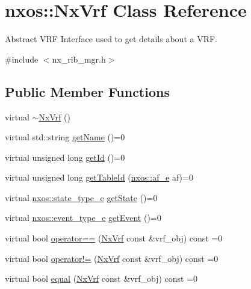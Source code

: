 \hypertarget{classnxos_1_1_nx_vrf}{}\section{nxos\+:\+:Nx\+Vrf Class Reference}
\label{classnxos_1_1_nx_vrf}


Abstract V\+RF Interface used to get details about a V\+RF.  




{\ttfamily \#include $<$nx\+\_\+rib\+\_\+mgr.\+h$>$}

\subsection*{Public Member Functions}
\begin{DoxyCompactItemize}
\item 
virtual \mbox{\hyperlink{classnxos_1_1_nx_vrf_ad5f50e3424b3d78304447600a3678e0b}{$\sim$\+Nx\+Vrf}} ()
\item 
virtual std\+::string \mbox{\hyperlink{classnxos_1_1_nx_vrf_a276a8d8170f372089a5653bdd7febfde}{get\+Name}} ()=0
\item 
virtual unsigned long \mbox{\hyperlink{classnxos_1_1_nx_vrf_a4ab30d5ff7a1d5d2abbab21652cd59fa}{get\+Id}} ()=0
\item 
virtual unsigned long \mbox{\hyperlink{classnxos_1_1_nx_vrf_a6f1529908decf0dfb531e674440d82ed}{get\+Table\+Id}} (\mbox{\hyperlink{nx__common_8h_a3a667f48b94db10aa398940dc5bf72d7}{nxos\+::af\+\_\+e}} af)=0
\item 
virtual \mbox{\hyperlink{nx__common_8h_a7c257059d03188765435b36e95dbb764}{nxos\+::state\+\_\+type\+\_\+e}} \mbox{\hyperlink{classnxos_1_1_nx_vrf_a443e508684e9804f14cc3526302ac8b4}{get\+State}} ()=0
\item 
virtual \mbox{\hyperlink{nx__common_8h_af9a9040b7681199d386e94eb888018cb}{nxos\+::event\+\_\+type\+\_\+e}} \mbox{\hyperlink{classnxos_1_1_nx_vrf_a42bdba27e42981d74066a72c24809c98}{get\+Event}} ()=0
\item 
virtual bool \mbox{\hyperlink{classnxos_1_1_nx_vrf_adc5d2e97b5fceb4fab75c448fb54ada5}{operator==}} (\mbox{\hyperlink{classnxos_1_1_nx_vrf}{Nx\+Vrf}} const \&vrf\+\_\+obj) const =0
\item 
virtual bool \mbox{\hyperlink{classnxos_1_1_nx_vrf_a2cc336534a1caff79ade7ed9b2a5a110}{operator!=}} (\mbox{\hyperlink{classnxos_1_1_nx_vrf}{Nx\+Vrf}} const \&vrf\+\_\+obj) const =0
\item 
virtual bool \mbox{\hyperlink{classnxos_1_1_nx_vrf_ade190af878a57a5f49a329fdffd6714e}{equal}} (\mbox{\hyperlink{classnxos_1_1_nx_vrf}{Nx\+Vrf}} const \&vrf\+\_\+obj) const =0
\end{DoxyCompactItemize}


